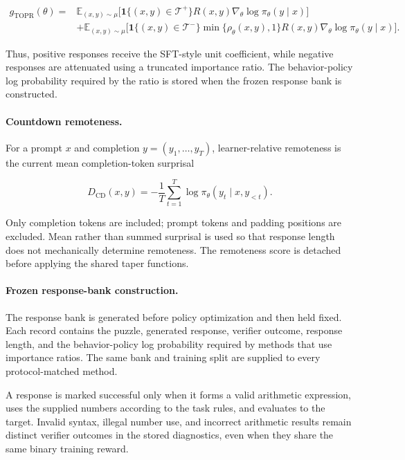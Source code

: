 \[
\begin{aligned}
g_{\mathrm{TOPR}}(\theta)
={}&
\mathbb{E}_{(x,y)\sim\mu}
\Big[
\mathbf{1}\{(x,y)\in\mathcal{T}^{+}\}
R(x,y)
\nabla_\theta\log\pi_\theta(y\mid x)
\Big]
\\
&+
\mathbb{E}_{(x,y)\sim\mu}
\Big[
\mathbf{1}\{(x,y)\in\mathcal{T}^{-}\}
\min\{\rho_\theta(x,y),1\}
R(x,y)
\nabla_\theta\log\pi_\theta(y\mid x)
\Big].
\end{aligned}
\]

Thus, positive responses receive the SFT-style unit coefficient, while
negative responses are attenuated using a truncated importance ratio.
The behavior-policy log probability required by the ratio is stored
when the frozen response bank is constructed.

\paragraph{Countdown remoteness.}

For a prompt \(x\) and completion
\(y=(y_1,\ldots,y_T)\), learner-relative remoteness is the current mean
completion-token surprisal

\[
D_{\mathrm{CD}}(x,y)
=
-\frac{1}{T}
\sum_{t=1}^{T}
\log
\pi_\theta
\left(
y_t\mid x,y_{<t}
\right).
\]

Only completion tokens are included; prompt tokens and padding positions
are excluded. Mean rather than summed surprisal is used so that response
length does not mechanically determine remoteness. The remoteness score
is detached before applying the shared taper functions.

\paragraph{Frozen response-bank construction.}

The response bank is generated before policy optimization and then held
fixed. Each record contains the puzzle, generated response, verifier
outcome, response length, and the behavior-policy log probability
required by methods that use importance ratios. The same bank and
training split are supplied to every protocol-matched method.

A response is marked successful only when it forms a valid arithmetic
expression, uses the supplied numbers according to the task rules, and
evaluates to the target. Invalid syntax, illegal number use, and
incorrect arithmetic results remain distinct verifier outcomes in the
stored diagnostics, even when they share the same binary training
reward.

